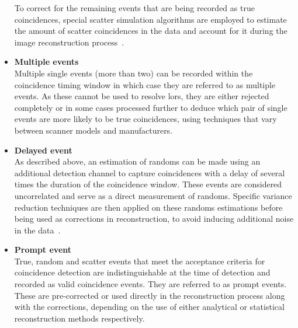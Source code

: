 \begin{itemize}
To correct for the remaining events that are being recorded as true coincidences, special scatter simulation algorithms are employed to estimate the amount of scatter coincidences in the data and account for it during the image reconstruction process~\cite{Watson1996,Polycarpou2011}.
%
\item\textbf{Multiple events}\\
Multiple single events (more than two) can be recorded within the coincidence timing window in which case they are referred to as multiple events. As these cannot be used to resolve \glspl{lor}, they are either rejected completely or in some cases processed further to deduce which pair of single events are more likely to be true coincidences, using techniques that vary between scanner models and manufacturers. 
%
\item\textbf{Delayed event}\\
As described above, an estimation of randoms can be made using an additional detection channel to capture coincidences with a delay of several times the duration of the coincidence window. These events are considered uncorrelated and serve as a direct measurement of randoms. Specific variance reduction techniques are then applied on these randoms estimations before being used as corrections in reconstruction, to avoid inducing additional noise in the data~\cite{Bailey2005}.
%
\item\textbf{Prompt event}\\
True, random and scatter events that meet the acceptance criteria for coincidence detection are indistinguishable at the time of detection and recorded as valid coincidence events. They are referred to as prompt events.
These are pre-corrected or used directly in the reconstruction process along with the corrections, depending on the use of either analytical or statistical reconstruction methods respectively.
\end{itemize}


